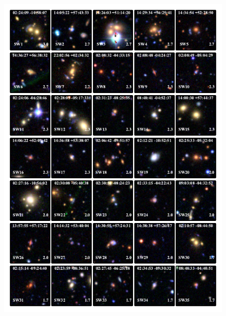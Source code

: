 \documentclass[useAMS,usenatbib,a4paper]{mn2e}
\begin{document}
\begin{figure}
\begin{center}
\includegraphics[scale=1.9]{sw-cfhtls-figs/lenscandfin.pdf}
\end{center}
\end{figure}
\end{document}
